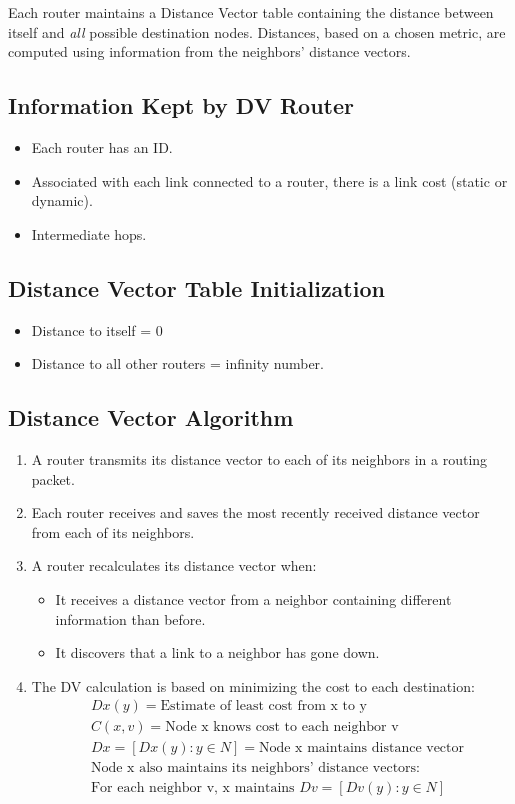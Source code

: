 \documentclass{korigamik}
\begin{document}
Each router maintains a Distance Vector table containing the distance between
itself and \textit{all} possible destination nodes. Distances, based on a
chosen metric, are computed using information from the neighbors' distance
vectors.


\subsection{Information Kept by DV Router}
\begin{itemize}
	\item Each router has an ID.
	\item Associated with each link connected to a router, there is a link cost
	      (static or dynamic).
	\item Intermediate hops.
\end{itemize}

\subsection{Distance Vector Table Initialization}
\begin{itemize}
	\item Distance to itself = 0
	\item Distance to all other routers = infinity number.
\end{itemize}

\subsection{Distance Vector Algorithm}
\begin{enumerate}
	\item A router transmits its distance vector to each of its neighbors in a
	      routing packet.
	\item Each router receives and saves the most recently received distance
	      vector from each of its neighbors.
	\item A router recalculates its distance vector when:
	      \begin{itemize}
		      \item It receives a distance vector from a neighbor containing
		            different information than before.
		      \item It discovers that a link to a neighbor has gone down.
	      \end{itemize}
	\item The DV calculation is based on minimizing the cost to each destination:
	      \begin{align*}
		       & Dx(y) = \text{Estimate of least cost from x to y}               \\
		       & C(x,v) = \text{Node x knows cost to each neighbor v}            \\
		       & Dx = [Dx(y): y \in N] = \text{Node x maintains distance vector} \\
		       & \text{Node x also maintains its neighbors' distance vectors:}   \\
		       & \text{For each neighbor v, x maintains } Dv = [Dv(y): y \in N]
	      \end{align*}
\end{enumerate}
\end{document}
